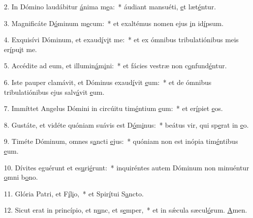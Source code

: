 2. In Dómino laudábitur \uline{á}nima m\uline{e}a:~* áudiant mansuéti, \uline{e}t læt\uline{é}ntur.\par 
3. Magnificáte D\uline{ó}minum m\uline{e}cum:~* et exaltémus nomen ejus \uline{i}n id\uline{í}psum.\par 
4. Exquisívi Dóminum, et exaud\uline{í}v\uline{i}t me:~* et ex ómnibus tribulatiónibus meis er\uline{í}pu\uline{i}t me.\par 
5. Accédite ad eum, et illumin\uline{á}m\uline{i}ni:~* et fácies vestræ non c\uline{o}nfund\uline{é}ntur.\par 
6. Iste pauper clamávit, et Dóminus exaud\uline{í}vit \uline{e}um:~* et de ómnibus tribulatiónibus ejus salv\uline{á}vit \uline{e}um.\par 
7. Immíttet Angelus Dómini in circúitu tim\uline{é}ntium \uline{e}um:~* et er\uline{í}piet \uline{e}os.\par 
8. Gustáte, et vidéte quóniam suávis est D\uline{ó}m\uline{i}nus:~* beátus vir, qui sp\uline{e}rat in \uline{e}o.\par 
9. Timéte Dóminum, omnes s\uline{a}ncti \uline{e}jus:~* quóniam non est inópia tim\uline{é}ntibus \uline{e}um.\par 
10. Dívites eguérunt et es\uline{u}ri\uline{é}runt:~* inquiréntes autem Dóminum non minuéntur \uline{o}mni b\uline{o}no.\par 
11. Glória Patri, et F\uline{í}l\uline{i}o,~* et Spir\uline{í}tui S\uline{a}ncto.\par 
12. Sicut erat in princípio, et n\uline{u}nc, et s\uline{e}mper,~* et in sǽcula sæcul\uline{ó}rum. \uline{A}men.\par 
